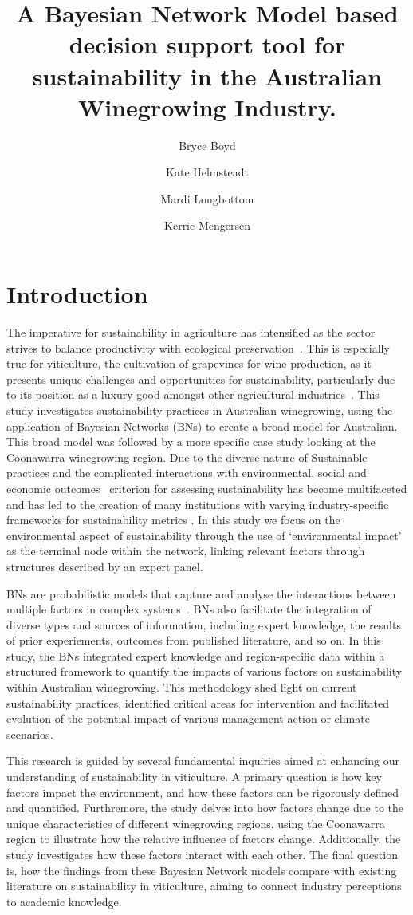 \documentclass[fleqn,10pt]{wlscirep}
\title{A Bayesian Network Model based decision support tool for sustainability in the Australian Winegrowing Industry.}
\author[1,2,3,*]{Bryce Boyd}
\author[1]{Kate Helmsteadt}
\author[2]{Mardi Longbottom}
\author[1]{Kerrie Mengersen}
\affil[1]{QUT, Mathematical Sciences, Brisbane, Australia}
\affil[2]{AWRI, Adelaide, Australia}
\affil[3]{Food Agility CRC}
\affil[*]{bryce.polley@awri.com.au}
\begin{document}
\section{Introduction}

The imperative for sustainability in agriculture has intensified as the sector strives to balance productivity with ecological preservation~. This is especially true for viticulture, the cultivation of grapevines for wine production, as it presents unique challenges and opportunities for sustainability, particularly due to its position as a luxury good amongst other agricultural industries~. This study investigates sustainability practices in Australian winegrowing, using the application of Bayesian Networks (BNs) to create a broad model for Australian. This broad model was followed by a more specific case study looking at the Coonawarra winegrowing region. Due to the diverse nature of Sustainable practices and the complicated interactions with environmental, social and economic outcomes~ criterion for assessing sustainability has become multifaceted and has led to the creation of many institutions with varying industry-specific frameworks for sustainability metrics . In this study we focus on the environmental aspect of sustainability through the use of `environmental impact' as the terminal node within the network, linking relevant factors through structures described by an expert panel.

BNs are probabilistic models that capture and analyse the interactions between multiple factors in complex systems~. BNs also facilitate the integration of diverse types and sources of information, including expert knowledge, the results of prior experiements, outcomes from published literature, and so on. In this study, the BNs integrated expert knowledge and region-specific data within a structured framework to quantify the impacts of various factors on sustainability within Australian winegrowing. This methodology shed light on current sustainability practices, identified critical areas for intervention and facilitated evolution of the potential impact of various management action or climate scenarios.

This research is guided by several fundamental inquiries aimed at enhancing our understanding of sustainability in viticulture. A primary question is how key factors impact the environment, and how these factors can be rigorously defined and quantified. Furthremore, the study delves into how factors change due to the unique characteristics of different winegrowing regions, using the Coonawarra region to illustrate how the relative influence of factors change. Additionally, the study investigates how these factors interact with each other. The final question is, how the findings from these Bayesian Network models compare with existing literature on sustainability in viticulture, aiming to connect industry perceptions to academic knowledge.
\end{document}
